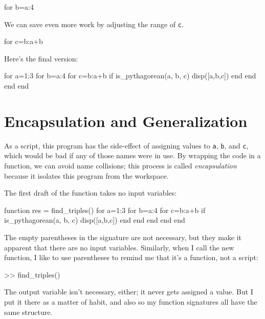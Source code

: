 \begin{code}
for b=a:4
\end{code}

We can save even more work by adjusting the range of {\tt c}.

\begin{code}
for c=b:a+b
\end{code}

Here's the final version:

\begin{code}
for a=1:3
    for b=a:4
        for c=b:a+b
            if is_pythagorean(a, b, c)
                disp([a,b,c])
            end
        end
    end
end
\end{code}

\section{Encapsulation and Generalization}

As a script, this program has the side-effect of assigning values to
{\tt a}, {\tt b}, and {\tt c}, which would be bad if any of those names were in use.  
By wrapping the code in a function, we can avoid name collisions; this process is called {\em encapsulation} because it isolates this program from the workspace.


The first draft of the function takes no input variables:

\begin{code}
function res = find_triples()
    for a=1:3
        for b=a:4
            for c=b:a+b
                if is_pythagorean(a, b, c)
                    disp([a,b,c])
                end
            end
        end
    end
end
\end{code}

The empty parentheses in the signature are not necessary, but
they make it apparent that there are no input variables.  Similarly,
when I call the new function, I like to use parentheses to remind me
that it's a function, not a script:

\begin{code}
>> find_triples()
\end{code}

The output variable isn't necessary, either; it
never gets assigned a value.  But I put it there as a matter of
habit, and also so my function signatures all have the same structure.


